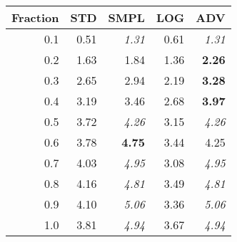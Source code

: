 \documentclass{standalone}
\begin{document}
\begin{tabular}{r|rrrr}
      \toprule
      Fraction & STD & SMPL & LOG & ADV\\
      \midrule
      0.1 & 0.51 & \emph{1.31} & 0.61 & \emph{1.31}\\
  0.2 & 1.63 & 1.84 & 1.36 & \textbf{2.26}\\
  0.3 & 2.65 & 2.94 & 2.19 & \textbf{3.28}\\
  0.4 & 3.19 & 3.46 & 2.68 & \textbf{3.97}\\
  0.5 & 3.72 & \emph{4.26} & 3.15 & \emph{4.26}\\
  0.6 & 3.78 & \textbf{4.75} & 3.44 & 4.25\\
  0.7 & 4.03 & \emph{4.95} & 3.08 & \emph{4.95}\\
  0.8 & 4.16 & \emph{4.81} & 3.49 & \emph{4.81}\\
  0.9 & 4.10 & \emph{5.06} & 3.36 & \emph{5.06}\\
  1.0 & 3.81 & \emph{4.94} & 3.67 & \emph{4.94}\\
  \bottomrule
\end{tabular}
\end{document}

